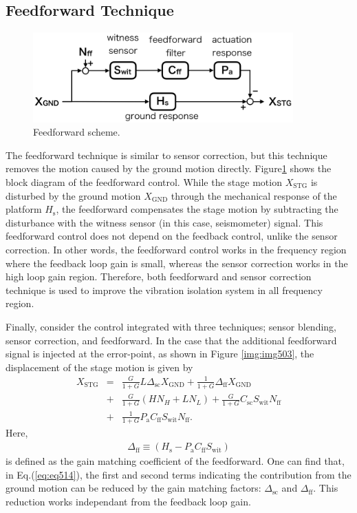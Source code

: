 \subsection{Feedforward Technique}
\begin{figure}[h]
  \begin{center}   
    \includegraphics[width=10cm]{./img_chap5/img506.png}
    \caption{Feedforward scheme.} \label{img:img506}
  \end{center}
\end{figure}
The feedforward technique is similar to sensor correction, but this technique removes the motion caused by the ground motion directly. Figure\ref{img:img506} shows the block diagram of the feedforward control. While the stage motion $X_{\mathrm{STG}}$ is disturbed by the ground motion $X_{\mathrm{GND}}$ through the mechanical response of the platform $H_{\mathrm{s}}$, the feedforward compensates the stage motion by subtracting the disturbance with the witness sensor (in this case, seismometer) signal. This feedforward control does not depend on the feedback control, unlike the sensor correction. In other words, the feedforward control works in the frequency region where the feedback loop gain is small, whereas the sensor correction works in the high loop gain region. Therefore, both feedforward and sensor correction technique is used to improve the vibration isolation system in all frequency region.


Finally, consider the control integrated with three techniques; sensor blending, sensor correction, and feedforward. In the case that the additional feedforward signal is injected at the error-point, as shown in Figure \ref{img:img503}, the displacement of the stage motion is given by
\begin{eqnarray}\nonumber
  X_{\mathrm{STG}} &=&\frac{G}{1+G}L\Delta_{\mathrm{sc}} X_{\mathrm{GND}} + \frac{1}{1+G} \Delta_{\mathrm{ff}} X_{\mathrm{GND}}\\ \nonumber
  &+& \frac{G}{1+G}\left(HN_{H}+LN_{L}\right) + \frac{G}{1+G}C_{\mathrm{sc}}S_{\mathrm{wit}}N_{\mathrm{ff}} \\ 
  &+& \frac{1}{1+G}P_{\mathrm{a}} C_{\mathrm{ff}}S_{\mathrm{wit}}N_{\mathrm{ff}} \label{eq:eq514}.
\end{eqnarray}
Here, 
\begin{eqnarray}
  \Delta_{\mathrm{ff}} \equiv \left(H_{\mathrm{s}}-P_{\mathrm{a}}C_{\mathrm{ff}}S_{\mathrm{wit}}\right) \label{eq:eq515}
\end{eqnarray}
is defined as the gain matching coefficient of the feedforward. One can find that, in  Eq.(\ref{eq:eq514}),  the first and second terms indicating the contribution from the ground motion can be reduced by the gain matching factors: $\Delta_{\mathrm{sc}}$ and $\Delta_{\mathrm{ff}}$. This reduction works independant from the feedback loop gain.


